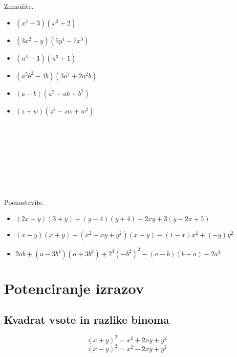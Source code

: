 \begin{multicols}{2}
    
        
            \begin{naloga}
                Zmnožite.
                \begin{itemize}
                    \item $(x^2-3)(x^3+2)$ 
                    \item $(3x^2-y)(5y^4-7x^3)$ 
                    \item $(u^3-1)(u^3+1)$ 
                    \item $(a^5b^2-4b)(3a^7+2a^2b)$ 
                    \item $(a-b)(a^2+ab+b^2)$ 
                    \item $(z+w)(z^2-zw+w^2)$ 
                \end{itemize}
            \end{naloga}

            ~\\~\\~\\~\\~\\~\\~
        
        \end{multicols}
        
            \begin{naloga}
                Poenostavite.
                \begin{itemize}
                    \item $(2x-y)(3+y)+(y-4)(y+4)-2xy+3(y-2x+5)$ 
                    \item $(x-y)(x+y)-(x^2+xy+y^2)(x-y)-(1-x)x^2+(-y)y^2$ 
                    \item $2ab+(a-3b^2)(a+3b^2)+2^3(-b^2)^2-(a-b)(b-a)-2a^3$  
                \end{itemize}
            \end{naloga}
        

\newpage
\section{Potenciranje izrazov}

            
                \subsection*{Kvadrat vsote in razlike binoma}
                    $$ (x+y)^2=x^2+2xy+y^2 $$
                    $$ (x-y)^2=x^2-2xy+y^2 $$
                
